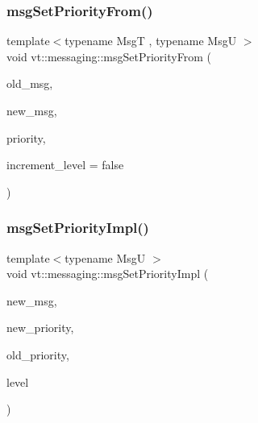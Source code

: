\subsubsection{\texorpdfstring{msg\+Set\+Priority\+From()}{msgSetPriorityFrom()}}
{\footnotesize\ttfamily template$<$typename MsgT , typename MsgU $>$ \\
void vt\+::messaging\+::msg\+Set\+Priority\+From (\begin{DoxyParamCaption}\item[{MsgT}]{old\+\_\+msg,  }\item[{MsgU}]{new\+\_\+msg,  }\item[{\hyperlink{namespacevt_a86bff9f556eb761b27fc8600d006ac04}{Priority\+Type}}]{priority,  }\item[{bool}]{increment\+\_\+level = {\ttfamily false} }\end{DoxyParamCaption})}

\mbox{\label{namespacevt_1_1messaging_ad71afa970305de275db8e91a5041d8e9}} 
\subsubsection{\texorpdfstring{msg\+Set\+Priority\+Impl()}{msgSetPriorityImpl()}}
{\footnotesize\ttfamily template$<$typename MsgU $>$ \\
void vt\+::messaging\+::msg\+Set\+Priority\+Impl (\begin{DoxyParamCaption}\item[{MsgU}]{new\+\_\+msg,  }\item[{\hyperlink{namespacevt_a86bff9f556eb761b27fc8600d006ac04}{Priority\+Type}}]{new\+\_\+priority,  }\item[{\hyperlink{namespacevt_a86bff9f556eb761b27fc8600d006ac04}{Priority\+Type}}]{old\+\_\+priority,  }\item[{\hyperlink{namespacevt_a53e07fdb3351b0f263e0dfd51b968d5e}{Priority\+Level\+Type}}]{level }\end{DoxyParamCaption})}

\mbox{\label{namespacevt_1_1messaging_a5cca7f3fb7db0bfe14b3426ef9132090}} 

